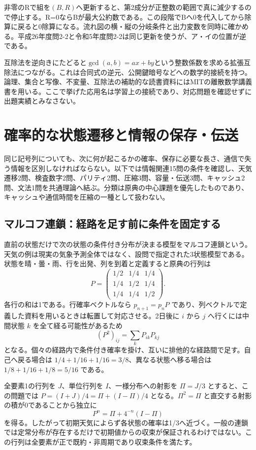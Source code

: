 非零のRで組を\((B,R)\)へ更新すると、第2成分が正整数の範囲で真に減少するので停止する。R=0ならBが最大公約数である。この段階でBへ0を代入してから除算に戻ると0除算になる。流れ図の横・縦の分岐条件と出力変数を同時に確かめる。平成26年度問2-2と令和5年度問2-2は同じ更新を使うが、ア・イの位置が逆である。

互除法を逆向きにたどると\(\gcd(a,b)=ax+by\)という整数係数を求める拡張互除法につながる。これは合同式の逆元、公開鍵暗号などへの数学的接続を持つ。論理、集合と写像、不変量、互除法の補助的な読書資料にはMITの離散数学講義書を用いる\cite{mit_mcs2015}。ここで挙げた応用名は学習上の接続であり、対応問題を確認せずに出題実績とみなさない。

\section{確率的な状態遷移と情報の保存・伝送}
同じ記号列についても、次に何が起こるかの確率、保存に必要な長さ、通信で失う情報を区別しなければならない。以下では情報関連15問の条件を確認し、天気遷移2問、検査数字2問、パリティ2問、圧縮3問、容量・伝送3問、キャッシュ2問、文法1問を共通理論へ結ぶ。分類は原典の中心課題を優先したものであり、キャッシュや通信時間を圧縮の一種として扱わない。

\subsection{マルコフ連鎖：経路を足す前に条件を固定する}
\label{theory:information:markov}
直前の状態だけで次の状態の条件付き分布が決まる模型をマルコフ連鎖という。天気の例は現実の気象予測全体ではなく、設問で指定された3状態模型である。状態を晴・曇・雨、行を出発、列を到着と定義すると原典の行列は
\[
 P=\begin{pmatrix}1/2&1/4&1/4\\1/4&1/2&1/4\\1/4&1/4&1/2\end{pmatrix}.
\]
各行の和は1である。行確率ベクトルなら \(p_{n+1}=p_nP\) であり、列ベクトルで定義した資料を用いるときは転置して対応させる\cite{info_markov}。2日後に \(i\) から \(j\) へ行くには中間状態 \(k\) を全て経る可能性があるため
\[
 (P^2)_{ij}=\sum_kP_{ik}P_{kj}
\]
となる。個々の経路内で条件付き確率を掛け、互いに排他的な経路間で足す。自己へ戻る場合は \(1/4+1/16+1/16=3/8\)、異なる状態へ移る場合は \(1/8+1/16+1/8=5/16\) である。

全要素1の行列を \(J\)、単位行列を \(I\)、一様分布への射影を \(\Pi=J/3\) とすると、この問題では \(P=(I+J)/4=\Pi+(I-\Pi)/4\) となる。\(\Pi^2=\Pi\) と直交する射影の積が0であることから独立に
\[
 P^n=\Pi+4^{-n}(I-\Pi)
\]
を得る。したがって初期天気によらず各状態の確率は1/3へ近づく。一般の連鎖では定常分布が存在するだけで初期値からの収束が保証されるわけではない。この行列は全要素が正で既約・非周期であり収束条件を満たす。

